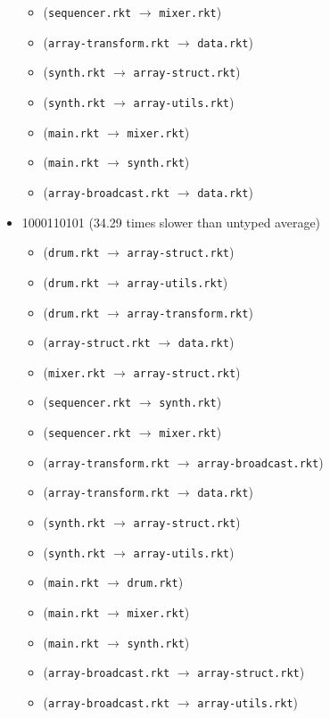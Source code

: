\documentclass{article}
\newcommand{\mono}[1]{\texttt{#1}}
\begin{document}
\begin{itemize}
\begin{itemize}
  \item (\mono{sequencer.rkt} $\rightarrow$ \mono{mixer.rkt})
  \item (\mono{array-transform.rkt} $\rightarrow$ \mono{data.rkt})
  \item (\mono{synth.rkt} $\rightarrow$ \mono{array-struct.rkt})
  \item (\mono{synth.rkt} $\rightarrow$ \mono{array-utils.rkt})
  \item (\mono{main.rkt} $\rightarrow$ \mono{mixer.rkt})
  \item (\mono{main.rkt} $\rightarrow$ \mono{synth.rkt})
  \item (\mono{array-broadcast.rkt} $\rightarrow$ \mono{data.rkt})
  \end{itemize}
\item 1000110101 (34.29 times slower than untyped average)
  \begin{itemize}
  \item (\mono{drum.rkt} $\rightarrow$ \mono{array-struct.rkt})
  \item (\mono{drum.rkt} $\rightarrow$ \mono{array-utils.rkt})
  \item (\mono{drum.rkt} $\rightarrow$ \mono{array-transform.rkt})
  \item (\mono{array-struct.rkt} $\rightarrow$ \mono{data.rkt})
  \item (\mono{mixer.rkt} $\rightarrow$ \mono{array-struct.rkt})
  \item (\mono{sequencer.rkt} $\rightarrow$ \mono{synth.rkt})
  \item (\mono{sequencer.rkt} $\rightarrow$ \mono{mixer.rkt})
  \item (\mono{array-transform.rkt} $\rightarrow$ \mono{array-broadcast.rkt})
  \item (\mono{array-transform.rkt} $\rightarrow$ \mono{data.rkt})
  \item (\mono{synth.rkt} $\rightarrow$ \mono{array-struct.rkt})
  \item (\mono{synth.rkt} $\rightarrow$ \mono{array-utils.rkt})
  \item (\mono{main.rkt} $\rightarrow$ \mono{drum.rkt})
  \item (\mono{main.rkt} $\rightarrow$ \mono{mixer.rkt})
  \item (\mono{main.rkt} $\rightarrow$ \mono{synth.rkt})
  \item (\mono{array-broadcast.rkt} $\rightarrow$ \mono{array-struct.rkt})
  \item (\mono{array-broadcast.rkt} $\rightarrow$ \mono{array-utils.rkt})

\end{itemize}
\end{itemize}
\end{document}
